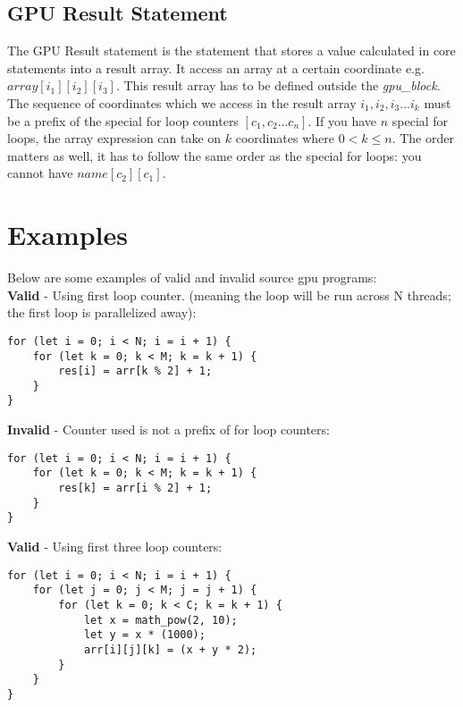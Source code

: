 \subsection*{GPU Result Statement}

The GPU Result statement is the statement that stores a value calculated in core statements into a result array. It access an array at a certain coordinate e.g. ${array[{i_1}][{i_2}][{i_3}]}$. This result array has to be defined outside the \textit{gpu\_block}.\\

The sequence of coordinates which we access in the result array ${{i_1}, {i_2}, {i_3} ... i_{k}}$ must be a prefix of the special for loop counters ${[c_1,c_2 ... c_n]}$. If you have ${n}$ special for loops, the array expression can take on ${k}$ coordinates where ${0 < k \leq n}$. The order matters as well, it has to follow the same order as the special for loops: you cannot have ${name[c_2][c_1]}$.

\newpage

\section*{Examples}

Below are some examples of valid and invalid source gpu programs:\\

\textbf{Valid} - Using first loop counter. (meaning the loop will be run across N threads; the first loop is parallelized away):
\begin{verbatim}
for (let i = 0; i < N; i = i + 1) {
    for (let k = 0; k < M; k = k + 1) {
        res[i] = arr[k % 2] + 1;
    }
}
\end{verbatim}

\textbf{Invalid} - Counter used is not a prefix of for loop counters:
\begin{verbatim}
for (let i = 0; i < N; i = i + 1) {
    for (let k = 0; k < M; k = k + 1) {
        res[k] = arr[i % 2] + 1;
    }
}
\end{verbatim}

\textbf{Valid} - Using first three loop counters:
\begin{verbatim}
for (let i = 0; i < N; i = i + 1) {
    for (let j = 0; j < M; j = j + 1) {
        for (let k = 0; k < C; k = k + 1) {
            let x = math_pow(2, 10);
            let y = x * (1000);
            arr[i][j][k] = (x + y * 2);
        }
    }
}
\end{verbatim}

